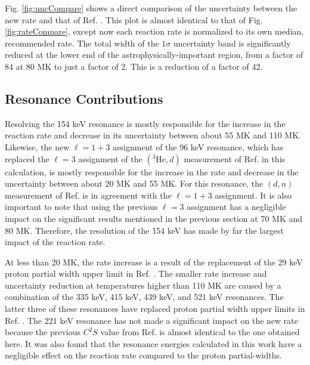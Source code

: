 Fig. \ref{fig:uncCompare} shows a direct comparison of the uncertainty between the new rate and that of Ref. \cite{Longland2018}. This plot is almost identical to that of Fig. \ref{fig:rateCompare}, except now each reaction rate is normalized to its own median, recommended rate. The total width of the $1\sigma$ uncertainty band is significantly reduced at the lower end of the astrophysically-important region, from a factor of 84 at 80 MK to just a factor of 2. This is a reduction of a factor of 42.

\subsection{Resonance Contributions} \label{subsec:resonance_contributions}

Resolving the 154 keV resonance is mostly responsible for the increase in the reaction rate and decrease in its uncertainty between about 55 MK and 110 MK. Likewise, the new $\ell=1+3$ assignment of the 96 keV resonance, which has replaced the $\ell=3$ assignment of the $(^{3}\mathrm{He},d)$ measurement of Ref. \cite{Cage1971} in this calculation, is mostly responsible for the increase in the rate and decrease in the uncertainty between about 20 MK and 55 MK. For this resonance, the $(d,n)$ measurement of Ref. \cite{Fuchs1969} is in agreement with the $\ell=1+3$ assignment. It is also important to note that using the previous $\ell=3$ assignment has a negligible impact on the significant results mentioned in the previous section at 70 MK and 80 MK. Therefore, the resolution of the 154 keV has made by far the largest impact of the reaction rate. 

At less than 20 MK, the rate increase is a result of the replacement of the 29 keV proton partial width upper limit in Ref. \cite{Longland2018}. The smaller rate increase and uncertainty reduction at temperatures higher than 110 MK are caused by a combination of the 335 keV, 415 keV, 439 keV, and 521 keV resonances. The latter three of these resonances have replaced proton partial width upper limits in Ref. \cite{Longland2018}. The 221 keV resonance has not made a significant impact on the new rate because the previous $C^{2}S$ value from Ref. \cite{Cage1971} is almost identical to the one obtained here. It was also found that the resonance energies calculated in this work have a negligible effect on the reaction rate compared to the proton partial-widths.

